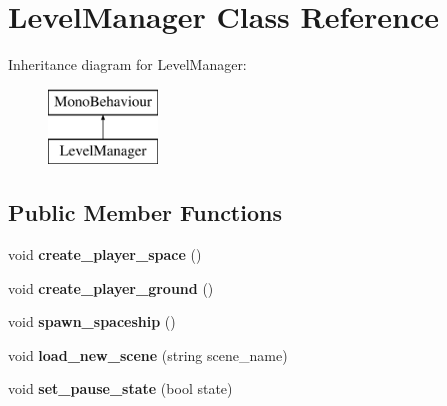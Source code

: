 \hypertarget{class_level_manager}{}\section{Level\+Manager Class Reference}
\label{class_level_manager}
Inheritance diagram for Level\+Manager\+:\begin{figure}[H]
\begin{center}
\leavevmode
\includegraphics[height=2.000000cm]{class_level_manager}
\end{center}
\end{figure}
\subsection*{Public Member Functions}
\begin{DoxyCompactItemize}
\item 
\mbox{\label{class_level_manager_aac4cfd0fe031319eda2f13c30d11414f}} 
void {\bfseries create\+\_\+player\+\_\+space} ()
\item 
\mbox{\label{class_level_manager_a553e0f113b0d7cf2cd66a87073ee179e}} 
void {\bfseries create\+\_\+player\+\_\+ground} ()
\item 
\mbox{\label{class_level_manager_a2ec5f6c40499a639a84a4ba8718260c4}} 
void {\bfseries spawn\+\_\+spaceship} ()
\item 
\mbox{\label{class_level_manager_a425d8e50c86371147f0ea622b9f8e639}} 
void {\bfseries load\+\_\+new\+\_\+scene} (string scene\+\_\+name)
\item 
\mbox{\label{class_level_manager_a3f4447f412ff6d3080246df5d0ea227d}} 
void {\bfseries set\+\_\+pause\+\_\+state} (bool state)
\end{DoxyCompactItemize}
